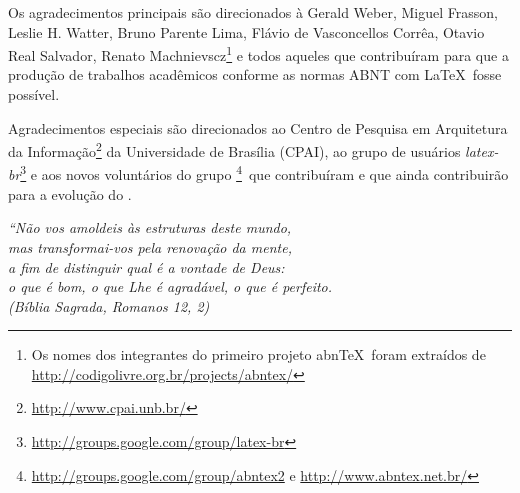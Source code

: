 \documentclass[
	10pt,				%
	oneside,			%
	a4paper,			%
	chapter=TITLE,		%
	english,			%
	brazil				%
	]{abntex2}
\begin{document}
\begin{agradecimentos}
Os agradecimentos principais são direcionados à Gerald Weber, Miguel Frasson,
Leslie H. Watter, Bruno Parente Lima, Flávio de Vasconcellos Corrêa, Otavio Real
Salvador, Renato Machnievscz\footnote{Os nomes dos integrantes do primeiro
projeto abn\TeX\ foram extraídos de
\url{http://codigolivre.org.br/projects/abntex/}} e todos aqueles que
contribuíram para que a produção de trabalhos acadêmicos conforme
as normas ABNT com \LaTeX\ fosse possível.

Agradecimentos especiais são direcionados ao Centro de Pesquisa em Arquitetura
da Informação\footnote{\url{http://www.cpai.unb.br/}} da Universidade de
Brasília (CPAI), ao grupo de usuários
\emph{latex-br}\footnote{\url{http://groups.google.com/group/latex-br}} e aos
novos voluntários do grupo
\emph{\abnTeX}\footnote{\url{http://groups.google.com/group/abntex2} e
\url{http://www.abntex.net.br/}}~que contribuíram e que ainda
contribuirão para a evolução do \abnTeX.

\end{agradecimentos}

\begin{epigrafe}
    \vspace*{\fill}
	\begin{flushright}
		\textit{``Não vos amoldeis às estruturas deste mundo, \\
		mas transformai-vos pela renovação da mente, \\
		a fim de distinguir qual é a vontade de Deus: \\
		o que é bom, o que Lhe é agradável, o que é perfeito.\\
		(Bíblia Sagrada, Romanos 12, 2)}
	\end{flushright}
\end{epigrafe}
\end{document}
